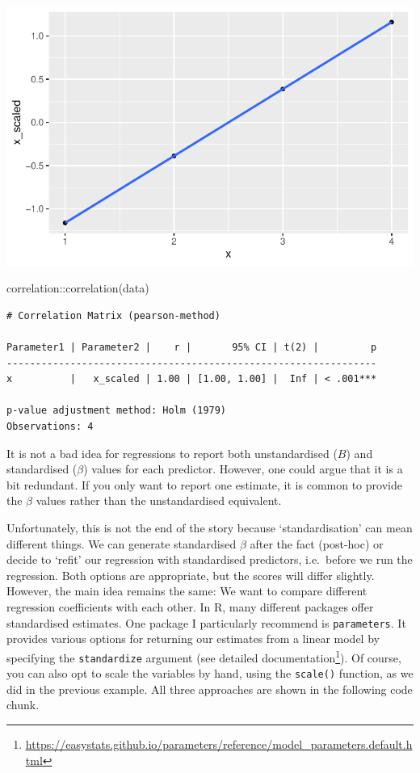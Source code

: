 \documentclass[
  letterpaper,
]{krantz}
\makeatletter
\newenvironment{Shaded}{\begin{snugshade}}{\end{snugshade}}
\newcommand{\FunctionTok}[1]{\textcolor[rgb]{0.28,0.35,0.67}{#1}}
\newcommand{\NormalTok}[1]{\textcolor[rgb]{0.00,0.23,0.31}{#1}}
\newcommand{\SpecialCharTok}[1]{\textcolor[rgb]{0.37,0.37,0.37}{#1}}
\renewcommand{\href}[2]{#2\footnote{\url{#1}}}
\newenvironment{kframe}{%
\medskip{}
\setlength{\fboxsep}{.8em}
 \def\at@end@of@kframe{}%
 \ifinner\ifhmode%
  \def\at@end@of@kframe{\end{minipage}}%
  \begin{minipage}{\columnwidth}%
 \fi\fi%
 \def\FrameCommand##1{\hskip\@totalleftmargin \hskip-\fboxsep
 \colorbox{shadecolor}{##1}\hskip-\fboxsep
     \hskip-\linewidth \hskip-\@totalleftmargin \hskip\columnwidth}%
 \MakeFramed {\advance\hsize-\width
   \@totalleftmargin\z@ \linewidth\hsize
   \@setminipage}}%
 {\par\unskip\endMakeFramed%
 \at@end@of@kframe}
\renewenvironment{Shaded}{\begin{kframe}}{\end{kframe}}
\makeatother
\begin{document}
\includegraphics{13_regressions_files/figure-pdf/scaled-unscaled-data-comparison-1.pdf}

\begin{Shaded}
\begin{Highlighting}[]
\NormalTok{correlation}\SpecialCharTok{::}\FunctionTok{correlation}\NormalTok{(data)}
\end{Highlighting}
\end{Shaded}

\begin{verbatim}
# Correlation Matrix (pearson-method)

Parameter1 | Parameter2 |    r |       95% CI | t(2) |         p
----------------------------------------------------------------
x          |   x_scaled | 1.00 | [1.00, 1.00] |  Inf | < .001***

p-value adjustment method: Holm (1979)
Observations: 4
\end{verbatim}

It is not a bad idea for regressions to report both unstandardised
(\(B\)) and standardised (\(\beta\)) values for each predictor. However,
one could argue that it is a bit redundant. If you only want to report
one estimate, it is common to provide the \(\beta\) values rather than
the unstandardised equivalent.

Unfortunately, this is not the end of the story because
`standardisation' can mean different things. We can generate
standardised \(\beta\) after the fact (post-hoc) or decide to `refit'
our regression with standardised predictors, i.e.~before we run the
regression. Both options are appropriate, but the scores will differ
slightly. However, the main idea remains the same: We want to compare
different regression coefficients with each other. In R, many different
packages offer standardised estimates. One package I particularly
recommend is \texttt{parameters}. It provides various options for
returning our estimates from a linear model by specifying the
\texttt{standardize} argument (see
\href{https://easystats.github.io/parameters/reference/model_parameters.default.html}{detailed
documentation}). Of course, you can also opt to scale the variables by
hand, using the \texttt{scale()} function, as we did in the previous
example. All three approaches are shown in the following code chunk.
\end{document}
